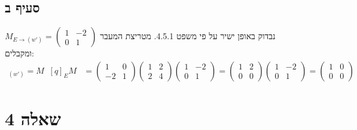 \documentclass{article}
\DeclareMathOperator{\tra}{^t}
\begin{document}
\subsection*{סעיף ב}

נבדוק באופן ישיר על פי משפט 4.5.1. מטריצת המעבר $M_{E\rightarrow (w')}=\begin{pmatrix}
        1 & -2 \\
        0 & 1
    \end{pmatrix}$ ומקבלים:
\begin{align*}
    [q]_{(w')}=M\tra [q]_E M & =\begin{pmatrix}
                                    1  & 0 \\
                                    -2 & 1
                                \end{pmatrix} \begin{pmatrix}
                                                  1 & 2 \\
                                                  2 & 4
                                              \end{pmatrix} \begin{pmatrix}
                                                                1 & -2 \\
                                                                0 & 1
                                                            \end{pmatrix}
    = \begin{pmatrix}
          1 & 2 \\
          0 & 0
      \end{pmatrix}\begin{pmatrix}
                       1 & -2 \\
                       0 & 1
                   \end{pmatrix}=\begin{pmatrix}
                                     1 & 0 \\
                                     0 & 0
                                 \end{pmatrix}
\end{align*}
\pagebreak

\section*{שאלה 4}
\end{document}
